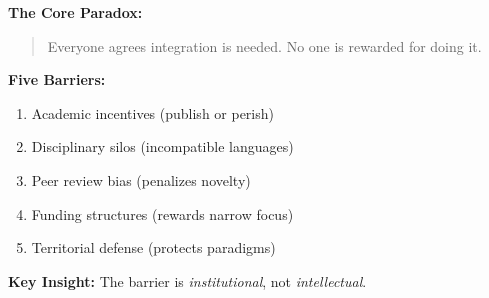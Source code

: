 \begin{abstract}
This appendix provides the meta-scientific justification for EBF's integrative approach. Drawing on the science of science, sociology of knowledge, and metascience literatures, we document five structural barriers that prevent integration of behavioral models: (1) academic incentive structures favoring novelty over synthesis, (2) disciplinary silos with incompatible formalisms, (3) peer review bias against interdisciplinary work, (4) funding structures rewarding narrow hypotheses, and (5) territorial defense of paradigmatic authority. We review 50+ key works from Kuhn (1962) through the contemporary metascience movement (Ioannidis, Nosek, et al.), demonstrating that the fragmentation of behavioral science is a \textit{structural} problem, not a knowledge gap. EBF is positioned as a response to this structural critique—built outside academia, validated through practice, and designed to unify rather than compete.
\end{abstract}

\begin{tcolorbox}[colback=blue!5!white, colframe=blue!75!black,
    title=Quick Reference: Why Integration Fails]

\textbf{The Core Paradox:}
\begin{quote}
Everyone agrees integration is needed. No one is rewarded for doing it.
\end{quote}

\textbf{Five Barriers:}
\begin{enumerate}[nosep]
\item Academic incentives (publish or perish)
\item Disciplinary silos (incompatible languages)
\item Peer review bias (penalizes novelty)
\item Funding structures (rewards narrow focus)
\item Territorial defense (protects paradigms)
\end{enumerate}

\textbf{Key Insight:} The barrier is \textit{institutional}, not \textit{intellectual}.

\end{tcolorbox}

